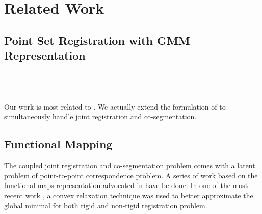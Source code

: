 \section{Related Work}
\label{sec:rw}
\subsection{Point Set Registration with GMM Representation}
\cite{TPS_RPM}\\
\cite{CPD}\\
\cite{GMM_PAMI}\\
Our work is most related to \cite{Evangelidis2014}. We actually extend the formulation of \cite{Evangelidis2014} to simultaneously handle joint registration and co-segmentation.
\subsection{Functional Mapping}
The coupled joint registration and co-segmentation problem comes with a latent problem of point-to-point correspondence problem. A series of work based on the functional maps representation advocated in \cite{Ovsjanikov:2012:FMF:2185520.2185526} have be done. In one of the most recent work \cite{Maron:2016:ConvRelax}, a convex relaxation technique was used to better approximate the global minimal for both rigid and non-rigid registration problem.   